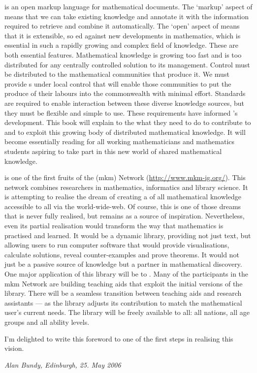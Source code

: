 {\omdoc} is an open markup language for mathematical documents. The `markup' aspect of
{\omdoc} means that we can take existing knowledge and annotate it with the information
required to retrieve and combine it automatically. The `open' aspect of {\omdoc} means
that it is extensible, so {ed} against new developments in
mathematics, which is essential in such a rapidly growing and complex field of
knowledge. These are both essential features. Mathematical knowledge is growing too fast
and is too distributed for any centrally controlled solution to its management. Control
must be distributed to the mathematical communities that produce it. We must provide
{s} under local control that will enable those communities
to put the produce of their labours into the commonwealth with minimal effort. Standards
are required to enable interaction between these diverse knowledge sources, but they must
be flexible and simple to use. These requirements have informed {\omdoc}'s
development. This book will explain to the
{} what they need to do to contribute to
and to exploit this growing body of distributed mathematical knowledge. It will become
essentially reading for all working mathematicians and mathematics students aspiring to
take part in this new world of shared mathematical knowledge.


{\omdoc} is one of the first fruits of the {}
({\sc mkm}) Network (\url{http://www.mkm-ig.org/}). This network combines researchers in
mathematics, informatics and library science. It is attempting to realise the dream of
creating a {} of all mathematical
knowledge accessible to all via the world-wide-web. Of course, this is one of those dreams
that is never fully realised, but remains as a source of inspiration. Nevertheless, even
its partial realisation would transform the way that mathematics is practised and
learned. It would be a dynamic library, providing not just text, but allowing users to run
computer software that would provide visualisations, calculate solutions, reveal
counter-examples and prove theorems. It would not just be a passive source of knowledge
but a partner in mathematical discovery. One major application of this library will be to
{}. Many of the participants in the {\sc mkm} Network are building
teaching aids that exploit the initial versions of the library. There will be a seamless
transition between teaching aids and research assistants --- as the library adjusts its
contribution to match the mathematical user's current needs. The library will be freely
available to all: all nations, all age groups and all ability levels.

I'm delighted to write this foreword to one of the first steps in realising this vision.

\hfill {\emph{Alan Bundy, Edinburgh, 25. May 2006}}


